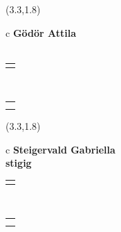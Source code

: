 \documentclass[11pt]{article}
\begin{document}
\makebox(3.3,1.8){
  \renewcommand\arraystretch{1.3}
  \begin{tabular}[c]{c}
    \hspace{8.5mm}
    \LARGE\bf{ Gödör Attila }\\
    \hspace{8.5mm}
    \Large{  }\\
    \renewcommand\arraystretch{3}
    \begin{tabular}[c]{c}
      \centering
      \fontfamily{phv}\selectfont{
        \textbf{
          \textsc{
            \scriptsize{
            \color{Dark}{ Ismerkedő }\color{Bright}{ Webmester }\color{Bright}{ Sminkmester }\color{Bright}{ Programozó }
            }
          }
        }
      }
    \end{tabular}
    \\
    \renewcommand\arraystretch{1}
    \begin{tabular}{p{3.3in}}
      \hspace{.7cm}\\
      \hspace{.7cm}\emph{  }\\
    \end{tabular}
  \end{tabular}
}

\makebox(3.3,1.8){
  \renewcommand\arraystretch{1.3}
  \begin{tabular}[c]{c}
    \hspace{8.5mm}
    \LARGE\bf{ Steigervald Gabriella }\\
    \hspace{8.5mm}
    \Large{ stigig }\\
    \renewcommand\arraystretch{3}
    \begin{tabular}[c]{c}
      \centering
      \fontfamily{phv}\selectfont{
        \textbf{
          \textsc{
            \scriptsize{
            \color{Bright}{ Ismerkedő }\color{Bright}{ Webmester }\color{Bright}{ Sminkmester }\color{Bright}{ Programozó }
            }
          }
        }
      }
    \end{tabular}
    \\
    \renewcommand\arraystretch{1}
    \begin{tabular}{p{3.3in}}
      \hspace{.7cm}\\
      \hspace{.7cm}\emph{  }\\
    \end{tabular}
  \end{tabular}
}
\end{document}
